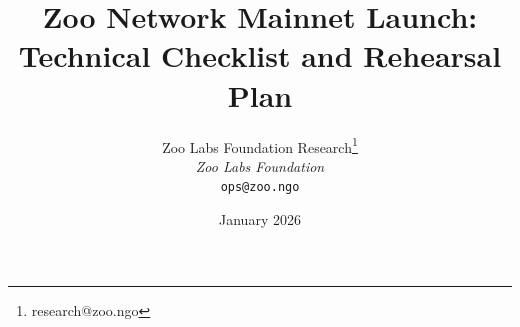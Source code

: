 \documentclass[11pt,letterpaper]{article}
\title{\textbf{Zoo Network Mainnet Launch:\\Technical Checklist and Rehearsal Plan}}
\author{
Zoo Labs Foundation Research\thanks{research@zoo.ngo}\\
\textit{Zoo Labs Foundation}\\
\texttt{ops@zoo.ngo}
}
\date{January 2026}
\begin{document}
\zoocoverpage

\tableofcontents
\newpage









\end{document}
